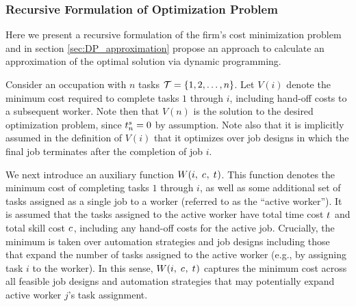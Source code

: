 \documentclass{article}
\theoremstyle{plain}
\theoremstyle{plain}
\begin{document}
\subsubsection{Recursive Formulation of Optimization Problem}
\label{sec:recursive_formulation}
Here we present a recursive formulation of the firm's cost minimization problem and in section \ref{sec:DP_approximation} propose an approach to calculate an approximation of the optimal solution via dynamic programming.

Consider an occupation with $n$ tasks $\mathcal{T} = \{1, 2, \ldots, n\}$.
Let $V(i)$ denote the minimum cost required to complete tasks $1$ through $i$, including hand-off costs to a subsequent worker.  Note then that $V(n)$ is the solution to the desired optimization problem, since $t^{s}_{n} = 0$ by assumption.  Note also that it is implicitly assumed in the definition of $V(i)$ that it optimizes over job designs in which the final job terminates after the completion of job $i$.

We next introduce an auxiliary function $W(i,\; c_{},\; t_{})$.
This function denotes the minimum cost of completing tasks $1$ through $i$, as well as some additional set of tasks assigned as a single job to a worker (referred to as the ``active worker'').  It is assumed that the tasks assigned to the active worker have total time cost $t_{}$ and total skill cost $c_{}$, including any hand-off costs for the active job.  Crucially, the minimum is taken over automation strategies and job designs including those that expand the number of tasks assigned to the active worker (e.g., by assigning task $i$ to the worker).
In this sense, $W(i,\; c_{},\; t_{})$ captures the minimum cost across all feasible job designs and automation strategies that may potentially expand active worker $j$'s task assignment.
\end{document}
